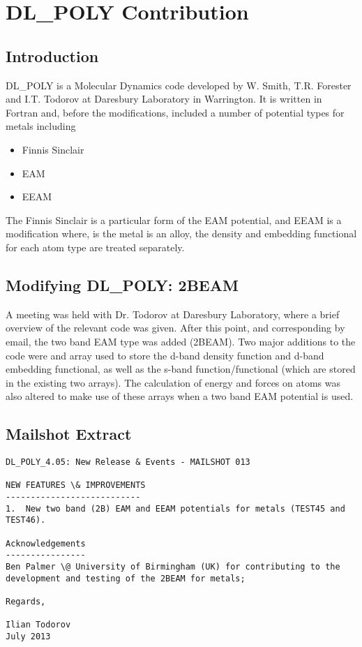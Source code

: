 \section{DL\_POLY Contribution}

\subsection{Introduction}

DL\_POLY is a Molecular Dynamics code developed by W. Smith, T.R. Forester and I.T. Todorov at Daresbury Laboratory in Warrington. It is written in Fortran and, before the modifications, included a number of potential types for metals including

\begin{itemize}
\item Finnis Sinclair
\item EAM
\item EEAM
\end{itemize}

The Finnis Sinclair is a particular form of the EAM potential, and EEAM is a modification where, is the metal is an alloy, the density and embedding functional for each atom type are treated separately.

\subsection{Modifying DL\_POLY: 2BEAM}

A meeting was held with Dr. Todorov at Daresbury Laboratory, where a brief overview of the relevant code was given.  After this point, and corresponding by email, the two band EAM type was added (2BEAM).  Two major additions to the code were and array used to store the d-band density function and d-band embedding functional, as well as the s-band function/functional (which are stored in the existing two arrays).  The calculation of energy and forces on atoms was also altered to make use of these arrays when a two band EAM potential is used.

\subsection{Mailshot Extract}

\begin{lstlisting}[style=sEmail,caption={Mailshot Extract}]
DL_POLY_4.05: New Release & Events - MAILSHOT 013

NEW FEATURES \& IMPROVEMENTS
--------------------------- 
1.  New two band (2B) EAM and EEAM potentials for metals (TEST45 and TEST46). 

Acknowledgements
----------------
Ben Palmer \@ University of Birmingham (UK) for contributing to the
development and testing of the 2BEAM for metals;

Regards,

Ilian Todorov
July 2013 


\end{lstlisting}
